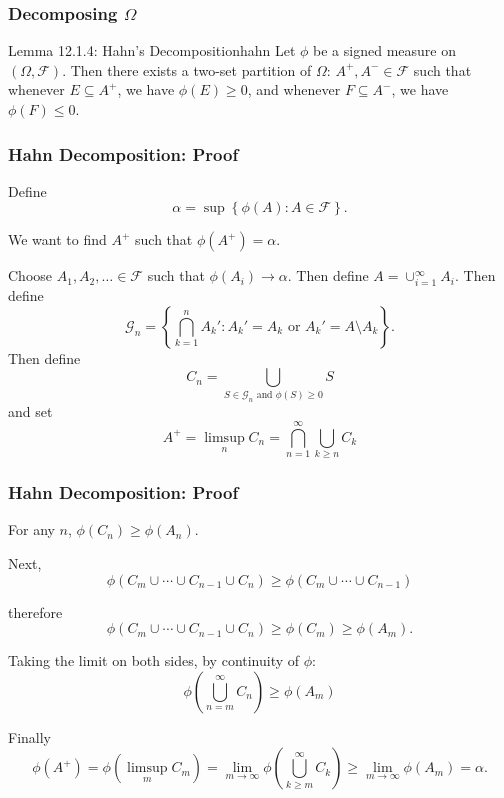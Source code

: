 \documentclass[handout]{beamer}
\begin{document}
\frame
{
\frametitle{Decomposing $\Omega$} 


\begin{mytheo}{Lemma 12.1.4: Hahn's Decomposition}{hahn}
Let $\phi$ be a signed measure on $(\Omega, \mathcal{F})$. Then there exists a two-set partition of $\Omega$: $A^+, A^- \in \mathcal{F}$ such that whenever $E \subseteq A^+$, we have $\phi(E) \ge 0$, and whenever $F \subseteq A^-$, we have $\phi(F) \le 0$.
\end{mytheo}

%   
%                                            

}





\frame
{
\frametitle{Hahn Decomposition: Proof} 

Define 
$$
\alpha = \sup \left\{ \phi(A) : A \in \mathcal{F} \right\}.
$$

We want to find $A^+$ such that $\phi(A^+) = \alpha$. 
\newline


Choose $A_1, A_2, \ldots \in \mathcal{F}$ such that $\phi(A_i) \to \alpha$. Then define $A = \cup_{i=1}^\infty A_i$. Then define 
$$
\mathcal{G}_n = \left\{ \bigcap_{k=1}^n A_k' : A_k' = A_k \text{ or } A_k' = A \setminus A_k  \right\}.
$$
Then define
$$
C_n = \bigcup_{S \in \mathcal{G}_n \text{ and } \phi(S) \ge 0} S
$$
and set 
$$
A^+ = \limsup_n C_n = \bigcap_{n=1}^{\infty} \bigcup_{k \ge n} C_k
$$

}

\frame
{
\frametitle{Hahn Decomposition: Proof} 

For any $n$, $\phi(C_n) \ge \phi(A_n)$.
\newline

Next, 
$$
\phi\left(C_m \cup \cdots \cup C_{n-1} \cup C_n \right) \ge \phi\left(C_m \cup \cdots \cup C_{n-1} \right)
$$

therefore
$$
\phi\left(C_m \cup \cdots \cup C_{n-1} \cup C_n \right) \ge \phi\left(C_m  \right) \ge  \phi\left(A_m  \right).
$$

Taking the limit on both sides, by continuity of $\phi$:
$$
\phi\left( \bigcup_{n=m}^{\infty} C_n  \right) \ge \phi\left(A_m  \right)
$$


Finally
$$
\phi(A^+) = \phi(\limsup_m C_m) = \lim_{m \to \infty} \phi\left( \bigcup_{k \ge m}^{\infty} C_k  \right) \ge \lim_{m \to \infty} \phi(A_m) = \alpha.
$$


}
\end{document}
